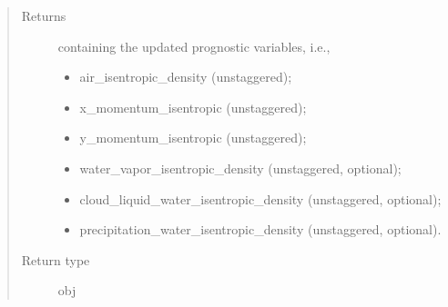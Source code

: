 \documentclass[letterpaper,10pt,english]{sphinxmanual}
\begin{document}
\begin{fulllineitems}
\begin{fulllineitems}
\begin{quote}
\begin{description}
\begin{itemize}
\begin{itemize}
\end{itemize}


\end{itemize}

\item[{Returns}] \leavevmode

{\hyperref[\detokenize{api:tasmania.storages.state_isentropic.StateIsentropic}]{}} containing the updated prognostic variables, i.e.,
\begin{itemize}
\item {} 
air\_isentropic\_density (unstaggered);

\item {} 
x\_momentum\_isentropic (unstaggered);

\item {} 
y\_momentum\_isentropic (unstaggered);

\item {} 
water\_vapor\_isentropic\_density (unstaggered, optional);

\item {} 
cloud\_liquid\_water\_isentropic\_density (unstaggered, optional);

\item {} 
precipitation\_water\_isentropic\_density (unstaggered, optional).

\end{itemize}


\item[{Return type}] \leavevmode
obj

\end{description}\end{quote}

\end{fulllineitems}



\end{fulllineitems}
\end{document}
